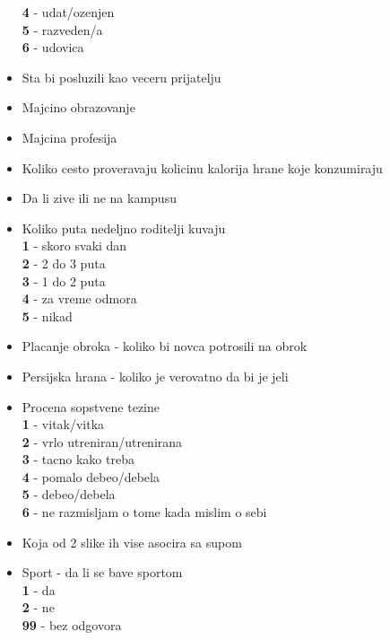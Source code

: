 \documentclass[12pt,a4paper]{article}
\begin{document}
\begin{itemize}
    \textbf{4} - udat/ozenjen\\
    \textbf{5} - razveden/a\\
    \textbf{6} - udovica\\
  \item Sta bi posluzili kao veceru prijatelju\\
  \item Majcino obrazovanje\\
  \item Majcina profesija\\
  \item Koliko cesto proveravaju kolicinu kalorija hrane koje konzumiraju\\
  \item Da li zive ili ne na kampusu\\
  \item Koliko puta nedeljno roditelji kuvaju\\
    \textbf{1} - skoro svaki dan\\
    \textbf{2} - 2 do 3 puta\\
    \textbf{3} - 1 do 2 puta\\
    \textbf{4} - za vreme odmora\\
    \textbf{5} - nikad\\
  \item Placanje obroka - koliko bi novca potrosili na obrok\\
  \item Persijska hrana - koliko je verovatno da bi je jeli\\
  \item Procena sopstvene tezine\\
    \textbf{1} - vitak/vitka\\
    \textbf{2} - vrlo utreniran/utrenirana\\
    \textbf{3} - tacno kako treba\\
    \textbf{4} - pomalo debeo/debela\\
    \textbf{5} - debeo/debela\\
    \textbf{6} - ne razmisljam o tome kada mislim o sebi\\
  \item Koja od 2 slike ih vise asocira sa supom\\
  \item Sport - da li se bave sportom\\
    \textbf{1} - da\\
    \textbf{2} - ne\\
    \textbf{99} - bez odgovora\\

\end{itemize}
\end{document}
